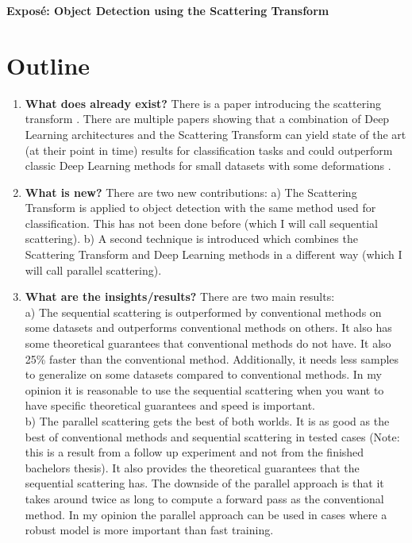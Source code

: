 \documentclass[a4paper,12pt]{scrartcl}
\begin{document}
	
	
\begin{center}
	\large{\textbf{Exposé: Object Detection using the Scattering Transform}}
\end{center}	

\section{Outline}

\begin{enumerate}
	\item \textbf{What does already exist?} There is a paper introducing the scattering transform \cite{scatteringTransform2012}. There are multiple papers showing that a combination of Deep Learning architectures and the Scattering Transform can yield state of the art (at their point in time) results for classification tasks and could outperform classic Deep Learning methods for small datasets with some deformations \cite{RotationScalingDeformationSifre2013} \cite{ScalingTheScatteringTransform2017} \cite{3DScatteringTransformNeuro2017}.
	\item \textbf{What is new?} There are two new contributions: a) The Scattering Transform is applied to object detection with the same method used for classification. This has not been done before (which I will call sequential scattering). b) A second technique is introduced which combines the Scattering Transform and Deep Learning methods in a different way (which I will call parallel scattering).
	\item \textbf{What are the insights/results?} There are two main results:\\
	a) The sequential scattering is outperformed by conventional methods on some datasets and outperforms conventional methods on others. It also has some theoretical guarantees that conventional methods do not have. It also 25\% faster than the conventional method. Additionally, it needs less samples to generalize on some datasets compared to conventional methods. In my opinion it is reasonable to use the sequential scattering when you want to have specific theoretical guarantees and speed is important. \\
	b) The parallel scattering gets the best of both worlds. It is as good as the best of conventional methods and sequential scattering in tested cases (Note: this is a result from a follow up experiment and not from the finished bachelors thesis). It also provides the theoretical guarantees that the sequential scattering has. The downside of the parallel approach is that it takes around twice as long to compute a forward pass as the conventional method. In my opinion the parallel approach can be used in cases where a robust model is more important than fast training.

\end{enumerate}
\end{document}
